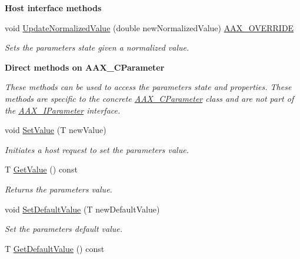 \begin{Indent}\textbf{ Host interface methods}\par
\begin{DoxyCompactItemize}
\item 
void \mbox{\hyperlink{a01537_a8a70b3c8bcff486c18e9a6e5c8ce4dda}{Update\+Normalized\+Value}} (double new\+Normalized\+Value) \mbox{\hyperlink{a00392_ac2f24a5172689ae684344abdcce55463}{A\+A\+X\+\_\+\+O\+V\+E\+R\+R\+I\+DE}}
\begin{DoxyCompactList}\small\item\em Sets the parameter\textquotesingle{}s state given a normalized value. \end{DoxyCompactList}\end{DoxyCompactItemize}
\end{Indent}
\begin{Indent}\textbf{ Direct methods on A\+A\+X\+\_\+\+C\+Parameter}\par
{\em These methods can be used to access the parameter\textquotesingle{}s state and properties. These methods are specific to the concrete \mbox{\hyperlink{a01537}{A\+A\+X\+\_\+\+C\+Parameter}} class and are not part of the \mbox{\hyperlink{a01857}{A\+A\+X\+\_\+\+I\+Parameter}} interface. }\begin{DoxyCompactItemize}
\item 
void \mbox{\hyperlink{a01537_a4dd6d99de8dc4440bac3ae4eefa19f94}{Set\+Value}} (T new\+Value)
\begin{DoxyCompactList}\small\item\em Initiates a host request to set the parameter\textquotesingle{}s value. \end{DoxyCompactList}\item 
T \mbox{\hyperlink{a01537_a87252a4473585fb80d9276d3dd37b6f8}{Get\+Value}} () const
\begin{DoxyCompactList}\small\item\em Returns the parameter\textquotesingle{}s value. \end{DoxyCompactList}\item 
void \mbox{\hyperlink{a01537_af6f47fe823dd44a0434ca5041f08d0bd}{Set\+Default\+Value}} (T new\+Default\+Value)
\begin{DoxyCompactList}\small\item\em Set the parameter\textquotesingle{}s default value. \end{DoxyCompactList}\item 
T \mbox{\hyperlink{a01537_a40893c27534e6c6eb3fbfd72f2d6844a}{Get\+Default\+Value}} () const

\end{DoxyCompactItemize}
\end{Indent}
